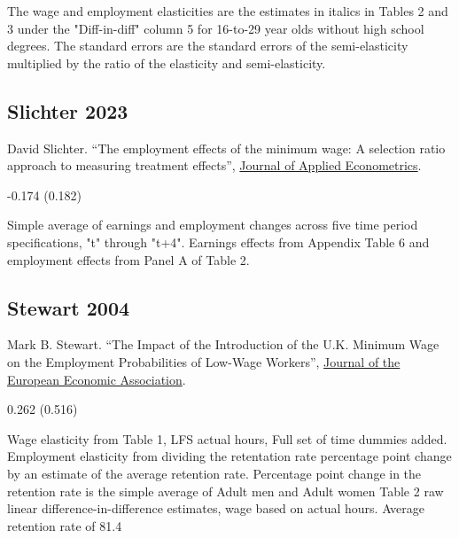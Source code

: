 \vspace{0.7em}

 The wage and employment elasticities are the estimates in italics in Tables 2 and 3 under the "Diff-in-diff" column 5 for 16-to-29 year olds without high school degrees. The standard errors are the standard errors of the semi-elasticity multiplied by the ratio of the elasticity and semi-elasticity.

\subsection*{Slichter 2023}
\vspace{-0.7em}

\noindent David Slichter. ``The employment effects of the minimum wage: A selection ratio approach to measuring treatment effects'', \href{https://doi.org/10.1002/jae.2954}{Journal of Applied Econometrics}.

\vspace{0.7em}

 -0.174 (0.182)

\vspace{0.7em}

 Simple average of earnings and employment changes across five time period specifications, "t" through "t+4". Earnings effects from Appendix Table 6 and employment effects from Panel A of Table 2.

\subsection*{Stewart 2004}
\vspace{-0.7em}

\noindent Mark B. Stewart. ``The Impact of the Introduction of the U.K. Minimum Wage on the Employment Probabilities of Low-Wage Workers'', \href{https://doi.org/10.1162/154247604323015481}{Journal of the European Economic Association}.

\vspace{0.7em}

 0.262 (0.516)

\vspace{0.7em}

 Wage elasticity from Table 1, LFS actual hours, Full set of time dummies added. Employment elasticity from dividing the retentation rate percentage point change by an estimate of the average retention rate. Percentage point change in the retention rate is the simple average of Adult men and Adult women Table 2 raw linear difference-in-difference estimates, wage based on actual hours. Average retention rate of 81.4%

